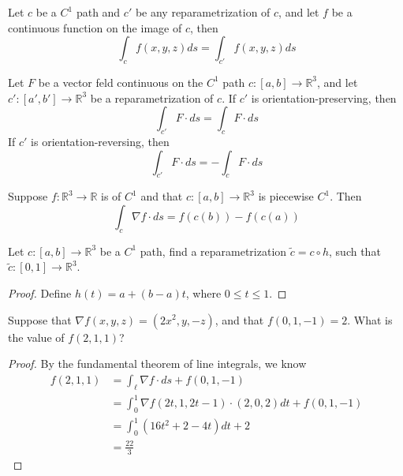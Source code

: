 \documentclass[openany]{book}
\newcommand{\R}{\mathbb{R}}
\begin{document}
\begin{prop}
    Let $c$ be a $C^1$ path and $c'$ be any reparametrization of $c$, and let $f$ be a continuous function on the image of $c$, then 
    \begin{equation*}
        \int_cf(x,y,z)ds=\int_{c'}f(x,y,z)ds
    \end{equation*}
\end{prop}

\begin{prop}
    Let $F$ be a vector feld continuous on the $C^1$ path $c:[a,b]\to\R^3$, and let $c':[a',b']\to\R^3$ be a reparametrization of $c$. If $c'$ is orientation-preserving, then 
    \begin{equation*}
        \int_{c'}F\cdot ds=\int_c F\cdot ds
    \end{equation*}
    If $c'$ is orientation-reversing, then 
    \begin{equation*}
        \int_{c'}F\cdot ds=-\int_cF\cdot ds
    \end{equation*}
\end{prop}

\begin{prop}
    Suppose $f:\R^3\to\R$ is of $C^1$ and that $c:[a,b]\to\R^3$ is piecewise $C^1$. Then 
    \begin{equation*}
        \int_c\nabla f\cdot ds=f(c(b))-f(c(a))
    \end{equation*}
\end{prop}


\begin{prob}
    Let $c:[a,b]\to\R^3$ be a $C^1$ path, find a reparametrization $\tilde{c}=c\circ h$, such that $\tilde{c}:[0,1]\to\R^3$.
\end{prob}
\begin{proof}
    Define $h(t)=a+(b-a)t$, where $0\leq t\leq 1$.
\end{proof}


\begin{prob}
    Suppose that $\nabla f(x,y,z)=(2x^2, y, -z)$, and that $f(0,1,-1)=2$. What is the value of $f(2, 1, 1)$?
\end{prob}
\begin{proof}
    By the fundamental theorem of line integrals, we know 
    \begin{align*}
        f(2,1,1)&=\int_\ell \nabla f \cdot ds+f(0,1,-1)\\
        &=\int_0^1 \nabla f(2t, 1, 2t-1)\cdot (2,0, 2)dt+f(0,1,-1)\\
        &=\int_0^1 \left(16t^2+2-4t\right)dt+2\\
        &=\frac{22}{3}
    \end{align*}
\end{proof}
\end{document}
